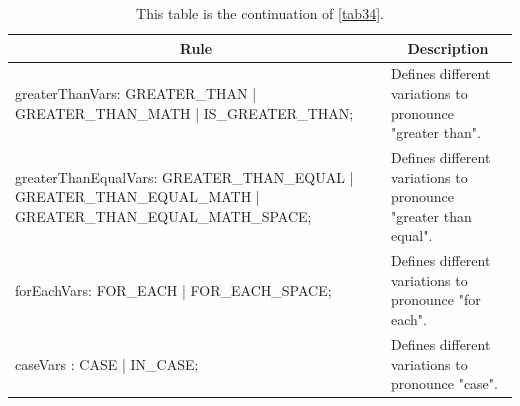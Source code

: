 \begin{table}[H]
	\centering
	\begin{tabular}{|p{8cm}|p{7cm}|}
		\hline
		\multicolumn{1}{|c|}{{\bf Rule}} & \multicolumn{1}{c|}{{\bf Description}} \\ \hline
		greaterThanVars: GREATER\_THAN | GREATER\_THAN\_MATH | IS\_GREATER\_THAN; & Defines different variations to pronounce "greater than". \\ \hline
		greaterThanEqualVars: GREATER\_THAN\_EQUAL | GREATER\_THAN\_EQUAL\_MATH | GREATER\_THAN\_EQUAL\_MATH\_SPACE; & Defines different variations to pronounce "greater than equal". \\ \hline
		forEachVars: FOR\_EACH | FOR\_EACH\_SPACE; & Defines different variations to pronounce "for each". \\ \hline
		caseVars : CASE | IN\_CASE; & Defines different variations to pronounce "case". \\ \hline
	\end{tabular}
	\caption{This table is the continuation of \autoref{tab34}.}
	\label{tab35}
\end{table}

